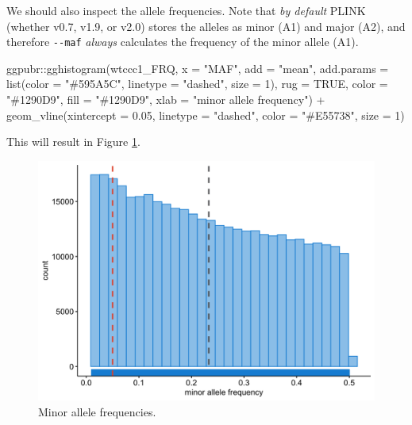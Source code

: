 \documentclass[
]{book}
\newenvironment{Shaded}{\begin{snugshade}}{\end{snugshade}}
\newcommand{\AttributeTok}[1]{\textcolor[rgb]{0.77,0.63,0.00}{#1}}
\newcommand{\ConstantTok}[1]{\textcolor[rgb]{0.00,0.00,0.00}{#1}}
\newcommand{\DecValTok}[1]{\textcolor[rgb]{0.00,0.00,0.81}{#1}}
\newcommand{\FloatTok}[1]{\textcolor[rgb]{0.00,0.00,0.81}{#1}}
\newcommand{\FunctionTok}[1]{\textcolor[rgb]{0.00,0.00,0.00}{#1}}
\newcommand{\NormalTok}[1]{#1}
\newcommand{\SpecialCharTok}[1]{\textcolor[rgb]{0.00,0.00,0.00}{#1}}
\newcommand{\StringTok}[1]{\textcolor[rgb]{0.31,0.60,0.02}{#1}}
\begin{document}
We should also inspect the allele frequencies. Note that \emph{by default} PLINK (whether v0.7, v1.9, or v2.0) stores the alleles as minor (A1) and major (A2), and therefore \texttt{-\/-maf} \emph{always} calculates the frequency of the minor allele (A1).

\begin{Shaded}
\begin{Highlighting}[]
\NormalTok{ggpubr}\SpecialCharTok{::}\FunctionTok{gghistogram}\NormalTok{(wtccc1\_FRQ, }\AttributeTok{x =} \StringTok{"MAF"}\NormalTok{,}
                    \AttributeTok{add =} \StringTok{"mean"}\NormalTok{, }\AttributeTok{add.params =} \FunctionTok{list}\NormalTok{(}\AttributeTok{color =} \StringTok{"\#595A5C"}\NormalTok{, }\AttributeTok{linetype =} \StringTok{"dashed"}\NormalTok{, }\AttributeTok{size =} \DecValTok{1}\NormalTok{),}
                    \AttributeTok{rug =} \ConstantTok{TRUE}\NormalTok{,}
                    \AttributeTok{color =} \StringTok{"\#1290D9"}\NormalTok{, }\AttributeTok{fill =} \StringTok{"\#1290D9"}\NormalTok{,}
                    \AttributeTok{xlab =} \StringTok{"minor allele frequency"}\NormalTok{) }\SpecialCharTok{+}
  \FunctionTok{geom\_vline}\NormalTok{(}\AttributeTok{xintercept =} \FloatTok{0.05}\NormalTok{, }\AttributeTok{linetype =} \StringTok{"dashed"}\NormalTok{,}
                \AttributeTok{color =} \StringTok{"\#E55738"}\NormalTok{, }\AttributeTok{size =} \DecValTok{1}\NormalTok{)}
\end{Highlighting}
\end{Shaded}

This will result in Figure \ref{fig:show-wtccc1-freq}.

\begin{figure}

{\centering \includegraphics[width=18.67in]{img/_gwas/WTCCC1 FREQ} 

}

\caption{Minor allele frequencies.}\label{fig:show-wtccc1-freq}
\end{figure}
\end{document}
